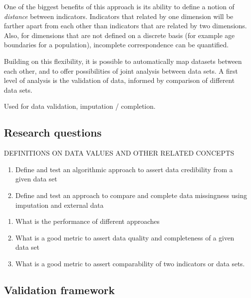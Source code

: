\documentclass[a4paper,11pt,final,twoside]{article}
\begin{document}
One of the biggest benefits of this approach is its ability to define a notion of \textit{distance} between indicators. Indicators that related by one dimension will be farther apart from each other than indicators that are related by two dimensions. Also, for dimensions that are not defined on a discrete basis (for example age boundaries for a population), incomplete correspondence can be quantified.

Building on this flexibility, it is possible to automatically map datasets between each other, and to offer possibilities of joint analysis between data sets. A first level of analysis is the validation of data, informed by comparison of different data sets.

Used for data validation, imputation / completion.


\subsection{Research questions}

DEFINITIONS ON DATA VALUES AND OTHER RELATED CONCEPTS


\begin{enumerate}
\item Define and test an algorithmic approach to assert data credibility from a given data set
\item Define and test an approach to compare and complete data missingness using imputation and external data
\end{enumerate}

\begin{enumerate}
\item What is the performance of different approaches
\item What is a good metric to assert data quality and completeness of a given data set
\item What is a good metric to assert comparability of two indicators or data sets.
\end{enumerate}

\subsection{Validation framework}
\end{document}
